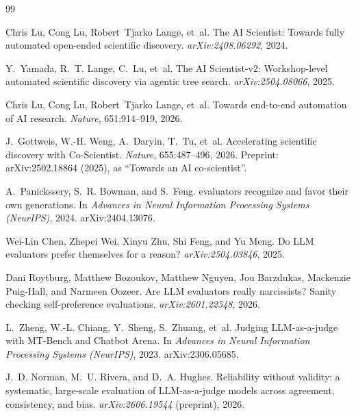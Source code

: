 \documentclass[11pt]{article}
\begin{document}
\begin{thebibliography}{99}\small

Chris Lu, Cong Lu, Robert~Tjarko Lange, et~al.
\newblock The {AI} {Scientist}: Towards fully automated open-ended scientific discovery.
\newblock \emph{arXiv:2408.06292}, 2024.

Y.~Yamada, R.~T. Lange, C.~Lu, et~al.
\newblock The {AI} {Scientist}-v2: Workshop-level automated scientific discovery via agentic tree search.
\newblock \emph{arXiv:2504.08066}, 2025.

Chris Lu, Cong Lu, Robert~Tjarko Lange, et~al.
\newblock Towards end-to-end automation of {AI} research.
\newblock \emph{Nature}, 651:914--919, 2026.

J.~Gottweis, W.-H. Weng, A.~Daryin, T.~Tu, et~al.
\newblock Accelerating scientific discovery with {Co-Scientist}.
\newblock \emph{Nature}, 655:487--496, 2026. Preprint: arXiv:2502.18864 (2025), as ``Towards an {AI} co-scientist''.

A.~Panickssery, S.~R. Bowman, and S.~Feng.
 evaluators recognize and favor their own generations.
\newblock In \emph{Advances in Neural Information Processing Systems (NeurIPS)}, 2024.
\newblock arXiv:2404.13076.

Wei-Lin Chen, Zhepei Wei, Xinyu Zhu, Shi Feng, and Yu Meng.
\newblock Do {LLM} evaluators prefer themselves for a reason?
\newblock \emph{arXiv:2504.03846}, 2025.

Dani Roytburg, Matthew Bozoukov, Matthew Nguyen, Jou Barzdukas, Mackenzie Puig-Hall, and Narmeen Oozeer.
\newblock Are {LLM} evaluators really narcissists? {S}anity checking self-preference evaluations.
\newblock \emph{arXiv:2601.22548}, 2026.

L.~Zheng, W.-L. Chiang, Y.~Sheng, S.~Zhuang, et~al.
\newblock Judging {LLM}-as-a-judge with {MT}-{Bench} and {Chatbot} {Arena}.
\newblock In \emph{Advances in Neural Information Processing Systems (NeurIPS)}, 2023.
\newblock arXiv:2306.05685.

J.~D. Norman, M.~U. Rivera, and D.~A. Hughes.
\newblock Reliability without validity: a systematic, large-scale evaluation of {LLM}-as-a-judge models across agreement, consistency, and bias.
\newblock \emph{arXiv:2606.19544} (preprint), 2026.


\end{thebibliography}
\end{document}
